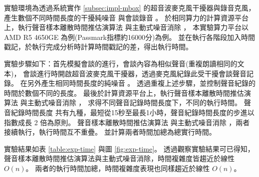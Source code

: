     實驗環境為透過系統實作 \ref{subsec:impl-mbox} 的超音波麥克風干擾器與錄音克風，
產生數個不同時間長度的干擾純噪音 \DEFrecN 與會談錄音 \DEFrecJ。
於相同算力的計算資源平台上，執行聲音樣本離散時間推估演算法 \DEFfuncEstm{} 與主動式噪音消除 \DEFfuncAnc{}，
本實驗算力平台以 AMD R5 4650GE 為例(Passmark指標約16000分)為例。
並在執行各階段加入時間戳記，於執行完成分析時計算時間戳記的差，得出執行時間。

    實驗步驟如下：首先模擬會談的進行，會談內容為相似聲音(重複朗讀相同的文本)，
會談進行時開啟超音波麥克風干擾器，透過麥克風紀錄此受干擾會談聲音記錄。
在另外產生相同時間長度的純噪音 \DEFrecN。
透過重複上述步驟，並控制聲音紀錄的時間於數個不同的長度。
最後於計算資源平台上，執行聲音樣本離散時間推估演算法 \DEFfuncEstm{} 與主動式噪音消除 \DEFfuncAnc{}，
求得不同聲音記錄時間長度下，不同的執行時間。
聲音紀錄時間長度 \DEFtimeREC 共有九種，最短從15秒至最長1小時，聲音紀錄時間長度的步進以指數成長 2 倍為原則。
聲音樣本離散時間推估演算法 \DEFfuncEstm{} 與主動式噪音消除 \DEFfuncAnc{}，兩者接續執行，執行時間互不重疊。
並計算兩者時間加總為總實行時間。

    實驗結果如表 \ref{table:exp-time} 與圖 \ref{fig:exp-time}。
透過觀察實驗結果可已得知，聲音樣本離散時間推估演算法與主動式噪音消除，時間複雜度皆趨近於線性 $O(n)$。
兩者的執行時間加總，時間複雜度表現也同樣趨近於線性 $O(n)$。


